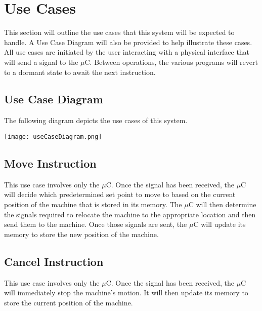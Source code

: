 \documentclass[titlepage]{article}
\begin{document}
\section{Use Cases}
This section will outline the use cases that this system will be expected to handle. A Use Case Diagram will also be provided to help illustrate these cases. All use cases are initiated by the user interacting with a physical interface that will send a signal to the $\mu$C. Between operations, the various programs will revert to a dormant state to await the next instruction.
\subsection{Use Case Diagram}
The following diagram depicts the use cases of this system.\\
\begin{center}\texttt{[image: useCaseDiagram.png]}\end{center}
\subsection{Move Instruction}
This use case involves only the $\mu$C. Once the signal has been received, the $\mu$C will decide which predetermined set point to move to based on the current position of the machine that is stored in its memory. The $\mu$C will then determine the signals required to relocate the machine to the appropriate location and then send them to the machine. Once those signals are sent, the $\mu$C will update its memory to store the new position of the machine.
\subsection{Cancel Instruction}
This use case involves only the $\mu$C. Once the signal has been received, the $\mu$C will immediately stop the machine's motion. It will then update its memory to store the current position of the machine.
\end{document}
